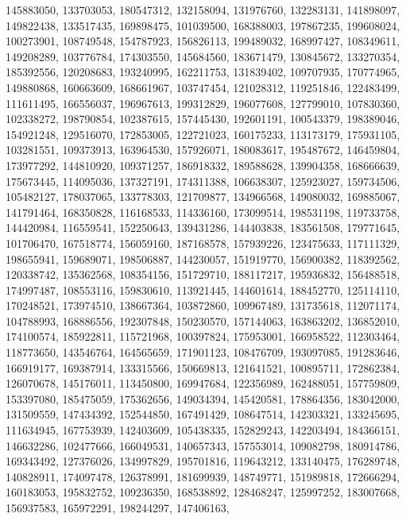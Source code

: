 {{    145883050, 133703053, 180547312, 132158094, 131976760, 132283131,
    141898097, 149822438, 133517435, 169898475, 101039500, 168388003,
    197867235, 199608024, 100273901, 108749548, 154787923, 156826113,
    199489032, 168997427, 108349611, 149208289, 103776784, 174303550,
    145684560, 183671479, 130845672, 133270354, 185392556, 120208683,
    193240995, 162211753, 131839402, 109707935, 170774965, 149880868,
    160663609, 168661967, 103747454, 121028312, 119251846, 122483499,
    111611495, 166556037, 196967613, 199312829, 196077608, 127799010,
    107830360, 102338272, 198790854, 102387615, 157445430, 192601191,
    100543379, 198389046, 154921248, 129516070, 172853005, 122721023,
    160175233, 113173179, 175931105, 103281551, 109373913, 163964530,
    157926071, 180083617, 195487672, 146459804, 173977292, 144810920,
    109371257, 186918332, 189588628, 139904358, 168666639, 175673445,
    114095036, 137327191, 174311388, 106638307, 125923027, 159734506,
    105482127, 178037065, 133778303, 121709877, 134966568, 149080032,
    169885067, 141791464, 168350828, 116168533, 114336160, 173099514,
    198531198, 119733758, 144420984, 116559541, 152250643, 139431286,
    144403838, 183561508, 179771645, 101706470, 167518774, 156059160,
    187168578, 157939226, 123475633, 117111329, 198655941, 159689071,
    198506887, 144230057, 151919770, 156900382, 118392562, 120338742,
    135362568, 108354156, 151729710, 188117217, 195936832, 156488518,
    174997487, 108553116, 159830610, 113921445, 144601614, 188452770,
    125114110, 170248521, 173974510, 138667364, 103872860, 109967489,
    131735618, 112071174, 104788993, 168886556, 192307848, 150230570,
    157144063, 163863202, 136852010, 174100574, 185922811, 115721968,
    100397824, 175953001, 166958522, 112303464, 118773650, 143546764,
    164565659, 171901123, 108476709, 193097085, 191283646, 166919177,
    169387914, 133315566, 150669813, 121641521, 100895711, 172862384,
    126070678, 145176011, 113450800, 169947684, 122356989, 162488051,
    157759809, 153397080, 185475059, 175362656, 149034394, 145420581,
    178864356, 183042000, 131509559, 147434392, 152544850, 167491429,
    108647514, 142303321, 133245695, 111634945, 167753939, 142403609,
    105438335, 152829243, 142203494, 184366151, 146632286, 102477666,
    166049531, 140657343, 157553014, 109082798, 180914786, 169343492,
    127376026, 134997829, 195701816, 119643212, 133140475, 176289748,
    140828911, 174097478, 126378991, 181699939, 148749771, 151989818,
    172666294, 160183053, 195832752, 109236350, 168538892, 128468247,
    125997252, 183007668, 156937583, 165972291, 198244297, 147406163,
}}
